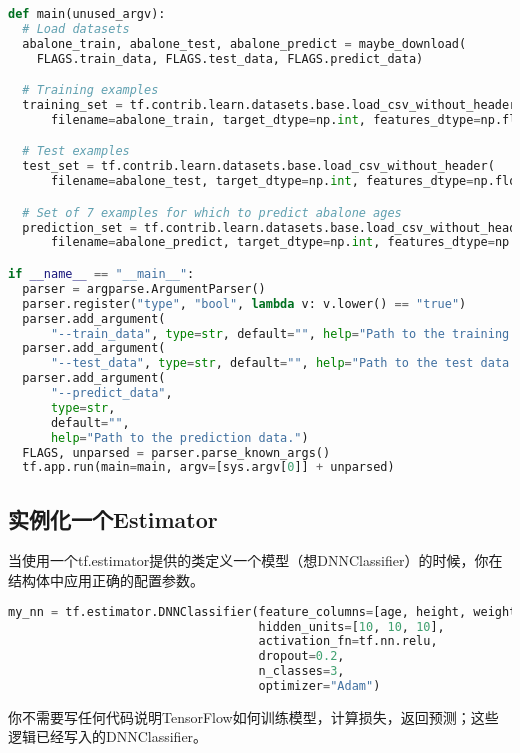 \begin{lstlisting}[language=Python]
def main(unused_argv):
  # Load datasets
  abalone_train, abalone_test, abalone_predict = maybe_download(
    FLAGS.train_data, FLAGS.test_data, FLAGS.predict_data)

  # Training examples
  training_set = tf.contrib.learn.datasets.base.load_csv_without_header(
      filename=abalone_train, target_dtype=np.int, features_dtype=np.float64)

  # Test examples
  test_set = tf.contrib.learn.datasets.base.load_csv_without_header(
      filename=abalone_test, target_dtype=np.int, features_dtype=np.float64)

  # Set of 7 examples for which to predict abalone ages
  prediction_set = tf.contrib.learn.datasets.base.load_csv_without_header(
      filename=abalone_predict, target_dtype=np.int, features_dtype=np.float64)

if __name__ == "__main__":
  parser = argparse.ArgumentParser()
  parser.register("type", "bool", lambda v: v.lower() == "true")
  parser.add_argument(
      "--train_data", type=str, default="", help="Path to the training data.")
  parser.add_argument(
      "--test_data", type=str, default="", help="Path to the test data.")
  parser.add_argument(
      "--predict_data",
      type=str,
      default="",
      help="Path to the prediction data.")
  FLAGS, unparsed = parser.parse_known_args()
  tf.app.run(main=main, argv=[sys.argv[0]] + unparsed)
\end{lstlisting}
\subsection{实例化一个Estimator}
当使用一个tf.estimator提供的类定义一个模型（想DNNClassifier）的时候，你在结构体中应用正确的配置参数。
\begin{lstlisting}[language=Python]
my_nn = tf.estimator.DNNClassifier(feature_columns=[age, height, weight],
                                   hidden_units=[10, 10, 10],
                                   activation_fn=tf.nn.relu,
                                   dropout=0.2,
                                   n_classes=3,
                                   optimizer="Adam")
\end{lstlisting}
你不需要写任何代码说明TensorFlow如何训练模型，计算损失，返回预测；这些逻辑已经写入的DNNClassifier。

